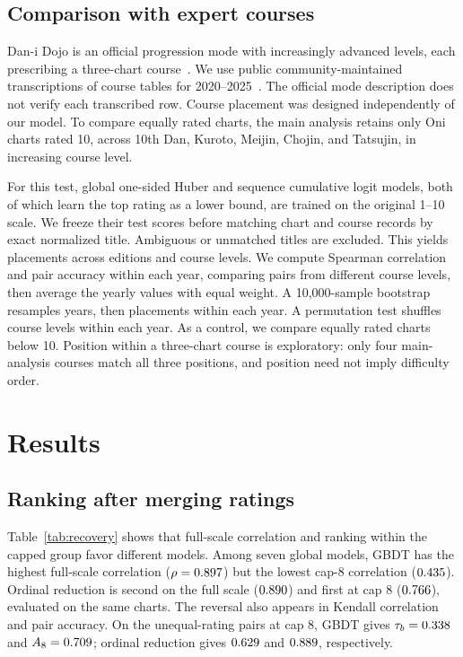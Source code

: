 \documentclass{article}
\begin{document}
\subsection{Comparison with expert courses}
Dan-i Dojo is an official progression mode with increasingly advanced levels,
each prescribing a three-chart course~\cite{bandaiDaniDojo}. We use public
community-maintained transcriptions of course tables for
2020--2025~\cite{taikoWikiDani}. The official mode description does not verify
each transcribed row. Course placement was designed
independently of our model. To compare equally rated charts, the main analysis
retains only Oni charts rated 10, across 10th Dan, Kuroto, Meijin, Chojin, and
Tatsujin, in increasing course level.

For this test, global one-sided Huber and sequence cumulative logit models,
both of which learn the top rating as a lower bound, are trained on the
original 1--10 scale. We freeze their
test scores before matching chart and course records by exact normalized
title. Ambiguous or unmatched titles are excluded. This yields
\DojoPlacementCount{} placements across \DojoYearCount{} editions and
\DojoTierCount{} course levels. We compute Spearman correlation and pair
accuracy within each year, comparing pairs from different course levels, then
average the yearly values with equal weight. A 10,000-sample bootstrap resamples years, then placements within each
year. A permutation test shuffles course levels within each year.
As a control, we compare equally rated charts below 10. Position within a
three-chart course is exploratory: only four main-analysis courses match all
three positions, and position need not imply difficulty order.

\section{Results}
\label{sec:results}
\subsection{Ranking after merging ratings}
\label{sec:reversal}
Table~\ref{tab:recovery} shows that full-scale correlation and ranking within
the capped group favor different models. Among seven global models, GBDT has the
highest full-scale correlation ($\rho=0.897$) but the lowest cap-8
correlation ($0.435$). Ordinal reduction is second on the full
scale ($0.890$) and first at cap 8 ($0.766$),
evaluated on the same \CapEightCount{} charts.
The reversal also appears in Kendall correlation and pair accuracy. On the
\CapEightPairCount{} unequal-rating pairs at cap 8, GBDT gives
$\tau_b=0.338$ and $A_8=0.709$; ordinal reduction gives
$0.629$ and $0.889$, respectively.
\end{document}
